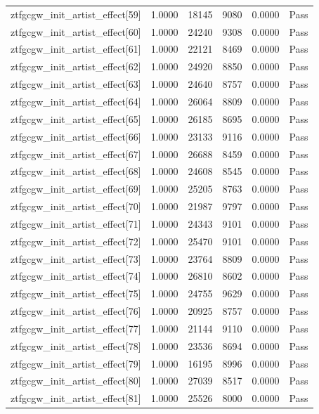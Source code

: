 \begin{table}[htbp]
\begin{tabular}{llrrll}
ztfgcgw\_init\_artist\_effect[59] & 1.0000 & 18145 & 9080 & 0.0000 & Pass \\
ztfgcgw\_init\_artist\_effect[60] & 1.0000 & 24240 & 9308 & 0.0000 & Pass \\
ztfgcgw\_init\_artist\_effect[61] & 1.0000 & 22121 & 8469 & 0.0000 & Pass \\
ztfgcgw\_init\_artist\_effect[62] & 1.0000 & 24920 & 8850 & 0.0000 & Pass \\
ztfgcgw\_init\_artist\_effect[63] & 1.0000 & 24640 & 8757 & 0.0000 & Pass \\
ztfgcgw\_init\_artist\_effect[64] & 1.0000 & 26064 & 8809 & 0.0000 & Pass \\
ztfgcgw\_init\_artist\_effect[65] & 1.0000 & 26185 & 8695 & 0.0000 & Pass \\
ztfgcgw\_init\_artist\_effect[66] & 1.0000 & 23133 & 9116 & 0.0000 & Pass \\
ztfgcgw\_init\_artist\_effect[67] & 1.0000 & 26688 & 8459 & 0.0000 & Pass \\
ztfgcgw\_init\_artist\_effect[68] & 1.0000 & 24608 & 8545 & 0.0000 & Pass \\
ztfgcgw\_init\_artist\_effect[69] & 1.0000 & 25205 & 8763 & 0.0000 & Pass \\
ztfgcgw\_init\_artist\_effect[70] & 1.0000 & 21987 & 9797 & 0.0000 & Pass \\
ztfgcgw\_init\_artist\_effect[71] & 1.0000 & 24343 & 9101 & 0.0000 & Pass \\
ztfgcgw\_init\_artist\_effect[72] & 1.0000 & 25470 & 9101 & 0.0000 & Pass \\
ztfgcgw\_init\_artist\_effect[73] & 1.0000 & 23764 & 8809 & 0.0000 & Pass \\
ztfgcgw\_init\_artist\_effect[74] & 1.0000 & 26810 & 8602 & 0.0000 & Pass \\
ztfgcgw\_init\_artist\_effect[75] & 1.0000 & 24755 & 9629 & 0.0000 & Pass \\
ztfgcgw\_init\_artist\_effect[76] & 1.0000 & 20925 & 8757 & 0.0000 & Pass \\
ztfgcgw\_init\_artist\_effect[77] & 1.0000 & 21144 & 9110 & 0.0000 & Pass \\
ztfgcgw\_init\_artist\_effect[78] & 1.0000 & 23536 & 8694 & 0.0000 & Pass \\
ztfgcgw\_init\_artist\_effect[79] & 1.0000 & 16195 & 8996 & 0.0000 & Pass \\
ztfgcgw\_init\_artist\_effect[80] & 1.0000 & 27039 & 8517 & 0.0000 & Pass \\
ztfgcgw\_init\_artist\_effect[81] & 1.0000 & 25526 & 8000 & 0.0000 & Pass \\

\end{tabular}
\end{table}
